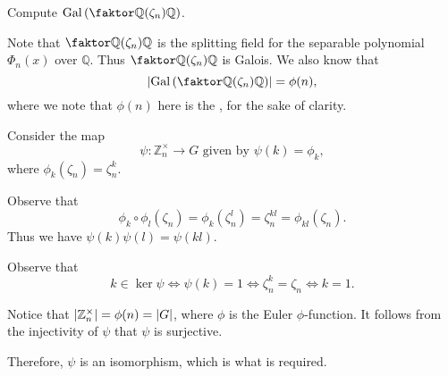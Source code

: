 \documentclass[notoc,notitlepage,nobib]{tufte-book}
\DeclareMathOperator{\Gal}{Gal}
\begin{document}
\begin{eg}
  Compute $\Gal\left(\quotient{\mathbb{Q}(\zeta_n)}{\mathbb{Q}}\right)$.

  \begin{solution}
    Note that $\quotient{\mathbb{Q}(\zeta_n)}{\mathbb{Q}}$ is the splitting
    field for the separable polynomial $\Phi_n(x)$ over $\mathbb{Q}$. Thus
    $\quotient{\mathbb{Q}(\zeta_n)}{\mathbb{Q}}$ is Galois. We also know that
    \begin{equation*}
      \abs{\Gal \left( \quotient{\mathbb{Q}(\zeta_n)}{\mathbb{Q}} \right)} =
      \phi(n),
    \end{equation*}
    where we note that $\phi(n)$ here is the ,
    for the sake of clarity.

    \noindent
    \hlbnoted{Claim: $G = \Gal \left( \quotient{\mathbb{Q}(\zeta_n)}{\mathbb{Q}}
    \right) \simeq \mathbb{Z}_n^\times$} Consider the map 
    \begin{equation*}
      \psi : \mathbb{Z}_n^\times \to G \text{ given by } \psi(k) = \phi_k,
    \end{equation*}
    where $\phi_k(\zeta_n) = \zeta_n^k$.

    \noindent
     Observe that
    \begin{equation*}
      \phi_k \circ \phi_l (\zeta_n) = \phi_k (\zeta_n^l) = \zeta_n^{kl} =
      \phi_{kl} (\zeta_n).
    \end{equation*}
    Thus we have $\psi(k)\psi(l) = \psi(kl)$.

    \noindent
     Observe that
    \begin{equation*}
      k \in \ker \psi \iff \psi(k) = 1 \iff \zeta_n^k = \zeta_n \iff k = 1.
    \end{equation*}

    \noindent
     Notice that $\left|\mathbb{Z}_n^\times\right| =
    \phi(n) = \left|G\right|$, where $\phi$ is the Euler $\phi$-function. It follows
    from the injectivity of $\psi$ that $\psi$ is surjective.

    Therefore, $\psi$ is an isomorphism, which is what is required.
  \end{solution}
\end{eg}
\end{document}
